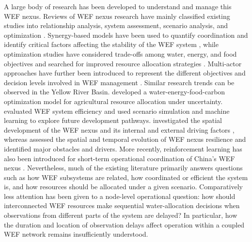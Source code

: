 \documentclass [a4paper,fleqn] {cas-dc}
\begin{document}
A large body of research has been developed to understand and manage this WEF nexus. Reviews of WEF nexus research have mainly classified existing studies into relationship analysis, system assessment, scenario analysis, and optimization \citep{albrecht2018,lyureview2026}. Synergy-based models have been used to quantify coordination and identify critical factors affecting the stability of the WEF system \citep{Zhang2020WEFSynergy,han2024}, while optimization studies have considered trade-offs among water, energy, and food objectives and searched for improved resource allocation strategies \citep{DiMartino2023FEWNOptimizationReview,hong2024,memarzadeh2019,ocaranza2024,zuniga2025,dimartino2025}. Multi-actor approaches have further been introduced to represent the different objectives and decision levels involved in WEF management \citep{SaintBois2024WEFMultiActor}. Similar research trends can be observed in the Yellow River Basin. \cite{Ren2022YellowRiverWEFC} developed a water-energy-food-carbon optimization model for agricultural resource allocation under uncertainty. \cite{Zhang2024YellowRiverWEFEfficiency} evaluated WEF system efficiency and used scenario simulation and machine learning to explore future development pathways. \cite{Wang2025YellowRiverWEFDrivers} investigated the spatial development of the WEF nexus and its internal and external driving factors \citep{wu2025}, whereas \cite{Niu2026YellowRiverWEFResilience} assessed the spatial and temporal evolution of WEF nexus resilience and identified major obstacles and drivers. More recently, reinforcement learning has also been introduced for short-term operational coordination of China's WEF nexus \citep{lyu2026}. Nevertheless, much of the existing literature primarily answers questions such as how WEF subsystems are related, how coordinated or efficient the system is, and how resources should be allocated under a given scenario. Comparatively less attention has been given to a node-level operational question: how should interconnected WEF resources make sequential water-allocation decisions when observations from different parts of the system are delayed? In particular, how the duration and location of observation delays affect operation within a coupled WEF network remains insufficiently understood.
\end{document}
